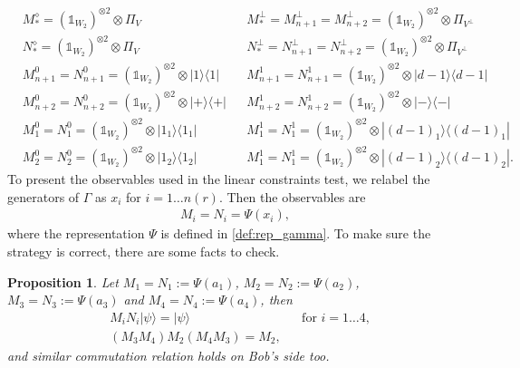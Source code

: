 \documentclass[11pt,letterpaper]{article}
\newcommand{\ket}[1]{|#1\rangle}
\newcommand{\ketbra}[2]{|#1\rangle\langle#2|}
\newcommand{\x}{\otimes}
\newcommand{\1}{\mathbb{1}}
\newcommand{\nr}{n(r)}
\newtheorem{proposition}[theorem]{Proposition}
\theoremstyle{definition}
\begin{document}
\begin{align*}
	&M_\ast^\diamond =(\1_{W_2})^{\x 2} \x \Pi_V && M_\ast^\perp = M_{n+1}^\perp = M_{n+2}^\perp = (\1_{W_2})^{\x 2} \x \Pi_{V^\perp}\\
	&N_\ast^\diamond = (\1_{W_2})^{\x 2} \x \Pi_V && N_\ast^\perp = N_{n+1}^\perp = N_{n+2}^\perp = (\1_{W_2})^{\x 2} \x \Pi_{V^\perp}\\
	&M_{n+1}^0 =N_{n+1}^0=(\1_{W_2})^{\x 2} \x  \ketbra{1}{1} && M_{n+1}^1=N_{n+1}^1 = (\1_{W_2})^{\x 2} \x \ketbra{d-1}{d-1}\\
	&M_{n+2}^0 =N_{n+2}^0=(\1_{W_2})^{\x 2} \x  \ketbra{+}{+} && M_{n+2}^1= N_{n+2}^1 = (\1_{W_2})^{\x 2} \x \ketbra{-}{-}\\
	&M_1^0 = N_1^0 =(\1_{W_2})^{\x 2} \x  \ketbra{1_1}{1_1} && M_1^1 = N_1^1 =(\1_{W_2})^{\x 2} \x  \ketbra{(d-1)_1}{(d-1)_1}\\
	&M_2^0 = N_2^0 = (\1_{W_2})^{\x 2} \x \ketbra{1_2}{1_2} && M_1^1 = N_1^1 = (\1_{W_2})^{\x 2} \x \ketbra{(d-1)_2}{(d-1)_2}.
\end{align*}
To present the observables used in the linear constraints test, we relabel the generators of $\Gamma$ as $x_i$ for $i = 1 \dots \nr$. Then the 
observables are
\begin{align}
	M_i = N_i = \Psi(x_i),
\end{align}
where the representation $\Psi$ is defined in \cref{def:rep_gamma}.
To make sure the strategy is correct, there are some facts to check.
\begin{proposition}
Let $M_1 = N_1 :=\Psi(a_1)$, $M_2 = N_2 := \Psi(a_2)$, $M_3 = N_3 := \Psi(a_3)$
and $M_4 = N_4 := \Psi(a_4)$, then
\begin{align}
	\label{eq:mn_preserve} &M_i N_i \ket{\psi} = \ket{\psi} && \text{for } i = 1 \dots 4,\\
	\label{eq:o2_comm} &(M_3M_4)M_2(M_4M_3) = M_2,
\end{align}
and similar commutation relation holds on Bob's side too.
\end{proposition}
\end{document}
